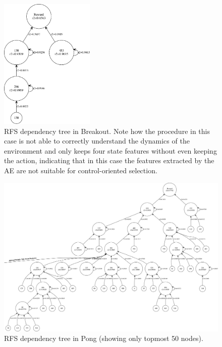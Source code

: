 %
%
\begin{figure}
    \includegraphics[width=0.4\textwidth]{pictures/experiments/rfs_tree_breakout}
    \centering
    \caption[RFS dependency tree in Breakout]{RFS dependency tree in Breakout.
	    Note how the procedure in this case is not able to correctly 
	    understand the dynamics of the environment and only keeps four 
	    state features without even keeping the action, indicating that in 
	    this case the features extracted by the AE are not suitable for 
	    control-oriented selection.}
    \label{f:rfs_tree_breakout}
\end{figure}
%
%
\begin{figure}
    \includegraphics[width=\textwidth]{pictures/experiments/rfs_tree_top_pong}
    \centering
    \caption[RFS dependency tree in Pong]{RFS dependency tree in Pong 
	     (showing only topmost 50 nodes).}
    \label{f:rfs_tree_pong}
\end{figure}
%

